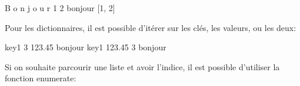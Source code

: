 \documentclass[letterpaper,10pt,english]{sphinxhowto}
\begin{document}
\begin{sphinxVerbatim}[commandchars=\\\{\}]
   
    
   
\end{sphinxVerbatim}

\begin{sphinxVerbatim}[commandchars=\\\{\}]
B
o
n
j
o
u
r
1
2
bonjour
[1, 2]
\end{sphinxVerbatim}

\sphinxAtStartPar
Pour les dictionnaires, il est possible d’itérer sur les clés, les valeurs, ou les deux:

\begin{sphinxVerbatim}[commandchars=\\\{\}]
    
    
   
    
    
     
\end{sphinxVerbatim}

\begin{sphinxVerbatim}[commandchars=\\\{\}]
key1
3
123.45
bonjour
key1 123.45
3 bonjour
\end{sphinxVerbatim}

\sphinxAtStartPar
Si on souhaite parcourir une liste et avoir l’indice, il est possible d’utiliser la fonction enumerate:

\begin{sphinxVerbatim}[commandchars=\\\{\}]
    
\end{sphinxVerbatim}
\end{document}
